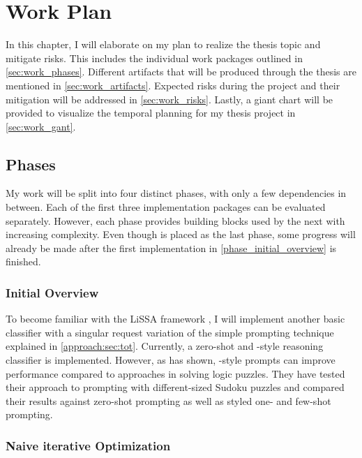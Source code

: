 \chapter{Work Plan}
\label{chap:work_plan}

In this chapter, I will elaborate on my plan to realize the thesis topic and mitigate risks. This includes the individual work packages outlined in \autoref{sec:work_phases}. Different artifacts that will be produced through the thesis are mentioned in \autoref{sec:work_artifacts}. Expected risks during the project and their mitigation will be addressed in \autoref{sec:work_risks}. Lastly, a giant chart will be provided to visualize the temporal planning for my thesis project in \autoref{sec:work_gant}.

\section{Phases}
\label{sec:work_phases}

My work will be split into four distinct phases, with only a few dependencies in between. Each of the first three implementation packages can be evaluated separately. However, each phase provides building blocks used by the next with increasing complexity. Even though  is placed as the last phase, some progress will already be made after the first implementation in \autoref{phase_initial_overview} is finished.


\subsection{Initial Overview}
\label{phase_initial_overview}

To become familiar with the LiSSA framework \cite{fuchss2025LiSSAGeneric}, I will implement another basic classifier with a singular request variation of the simple prompting technique \ToT  \cite{long2023LargeLanguage} explained in \autoref{approach:sec:tot}. 
Currently, a zero-shot and \CoT-style reasoning classifier is implemented. However, as \citeauthor{long2023LargeLanguage} has shown, \ToT-style prompts can improve performance compared to \CoT approaches in solving logic puzzles. They have tested their approach to \ToT prompting with different-sized Sudoku puzzles and compared their results against zero-shot prompting as well as \CoT styled one- and few-shot prompting. 


\subsection{Naive iterative Optimization}
\label{phase_naive_iterative}


